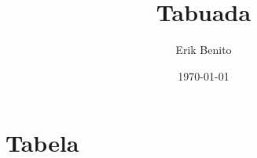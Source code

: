 \documentclass[a4paper]{article}
\title{Tabuada}
\author{Erik Benito}
\date{\today}
\begin{document}
    \maketitle

    \section{Tabela}

        
\end{document}

